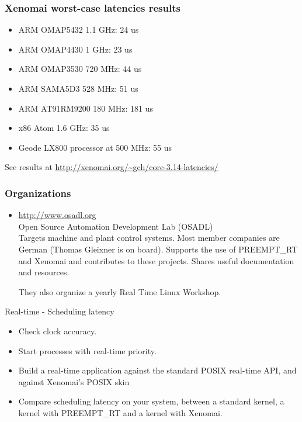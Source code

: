 \begin{frame}
  \frametitle{Xenomai worst-case latencies results}
  \begin{itemize}
  \item ARM OMAP5432 1.1 GHz: 24 us
  \item ARM OMAP4430 1 GHz: 23 us
  \item ARM OMAP3530 720 MHz: 44 us
  \item ARM SAMA5D3 528 MHz: 51 us
  \item ARM AT91RM9200 180 MHz: 181 us
  \item x86 Atom 1.6 GHz: 35 us
  \item Geode LX800 processor at 500 MHz: 55 us
  \end{itemize}
  See results at \url{http://xenomai.org/~gch/core-3.14-latencies/}
\end{frame}

\begin{frame}
  \frametitle{Organizations}
  \begin{itemize}
  \item \url{http://www.osadl.org}\\
    Open Source Automation Development Lab (OSADL)\\
    Targets machine and plant control systems. Most member companies
    are German (Thomas Gleixner is on board). Supports the use of
    PREEMPT\_RT and Xenomai and contributes to these projects. Shares
    useful documentation and resources.

    They also organize a yearly Real Time Linux Workshop.
  \end{itemize}
\end{frame}

\setuplabframe
{Real-time - Scheduling latency}
{
  \begin{itemize}
  \item Check clock accuracy.
  \item Start processes with real-time priority.
  \item Build a real-time application against the standard POSIX
        real-time API, and against Xenomai’s POSIX skin
  \item Compare scheduling latency on your system, between a standard
        kernel, a kernel with PREEMPT\_RT and a kernel with Xenomai.
  \end{itemize}
}


